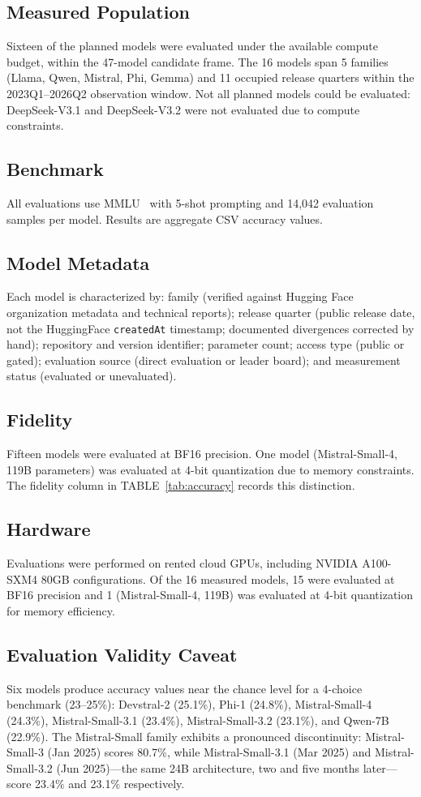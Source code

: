 \documentclass{ieeeaccess}
\theoremstyle{definition}
\theoremstyle{plain}
\begin{document}
\subsection{Measured Population}
Sixteen of the planned models were evaluated under the available compute budget, within the 47-model candidate frame. The 16 models span 5 families (Llama, Qwen, Mistral, Phi, Gemma) and 11 occupied release quarters within the 2023Q1--2026Q2 observation window. Not all planned models could be evaluated: DeepSeek-V3.1 and DeepSeek-V3.2 were not evaluated due to compute constraints.

\subsection{Benchmark}
All evaluations use MMLU~\cite{hendrycks2021} with 5-shot prompting and 14,042 evaluation samples per model. Results are aggregate CSV accuracy values.

\subsection{Model Metadata}
Each model is characterized by: family (verified against Hugging Face organization metadata and technical reports); release quarter (public release date, not the HuggingFace \texttt{createdAt} timestamp; documented divergences corrected by hand); repository and version identifier; parameter count; access type (public or gated); evaluation source (direct evaluation or leader board); and measurement status (evaluated or unevaluated).

\subsection{Fidelity}
Fifteen models were evaluated at BF16 precision. One model (Mistral-Small-4, 119B parameters) was evaluated at 4-bit quantization due to memory constraints. The fidelity column in TABLE~\ref{tab:accuracy} records this distinction.

\subsection{Hardware}
Evaluations were performed on rented cloud GPUs, including NVIDIA A100-SXM4 80GB configurations. Of the 16 measured models, 15 were evaluated at BF16 precision and 1 (Mistral-Small-4, 119B) was evaluated at 4-bit quantization for memory efficiency.

\subsection{Evaluation Validity Caveat}
Six models produce accuracy values near the chance level for a 4-choice benchmark (23--25\%): Devstral-2 (25.1\%), Phi-1 (24.8\%), Mistral-Small-4 (24.3\%), Mistral-Small-3.1 (23.4\%), Mistral-Small-3.2 (23.1\%), and Qwen-7B (22.9\%). The Mistral-Small family exhibits a pronounced discontinuity: Mistral-Small-3 (Jan 2025) scores 80.7\%, while Mistral-Small-3.1 (Mar 2025) and Mistral-Small-3.2 (Jun 2025)---the same 24B architecture, two and five months later---score 23.4\% and 23.1\% respectively.
\end{document}
